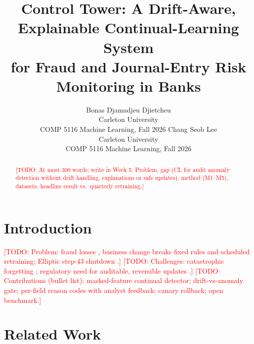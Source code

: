 \documentclass{article} %
\title{Control Tower: A Drift-Aware, Explainable Continual-Learning System\\
for Fraud and Journal-Entry Risk Monitoring in Banks}
\author{%
  Bonas Djamadjeu Djietcheu\\
  Carleton University\\
  COMP 5116 Machine Learning, Fall 2026
  \And
  Chang Seob Lee\\
  Carleton University\\
  COMP 5116 Machine Learning, Fall 2026
}
\date{}
\newcommand{\todo}[1]{\textcolor{red}{[TODO: #1]}}
\begin{document}
\maketitle

\begin{abstract}
\todo{At most 300 words; write in Week 5. Problem, gap (CL for audit
anomaly detection without drift handling, explanations or safe updates),
method (M1--M5), datasets, headline result vs.\ quarterly retraining.}
\end{abstract}

\section{Introduction}\label{sec:intro}
\todo{Problem: fraud losses \citep{acfe2020}, business change breaks fixed
rules and scheduled retraining; Elliptic step-43 shutdown \citep{weber2019elliptic}.}
\todo{Challenges: catastrophic forgetting \citep{kirkpatrick2017overcoming};
regulatory need for auditable, reversible updates \citep{osfi2025e23}.}
\todo{Contributions (bullet list): masked-feature continual detector; drift-vs-anomaly
gate; per-field reason codes with analyst feedback; canary rollback; open benchmark.}

\section{Related Work}\label{sec:related}
\end{document}

